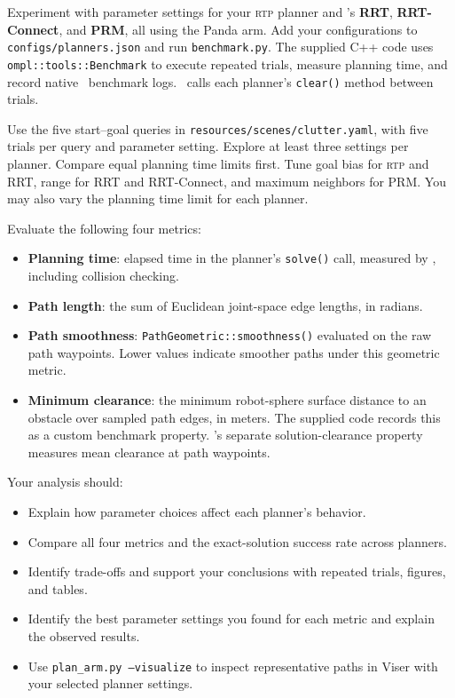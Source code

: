 \documentclass{comp450}
\begin{document}
\begin{enumerate*}
    \newpage
    \item
    Experiment with parameter settings for your \textsc{rtp} planner and \ompl's \textbf{RRT}, \textbf{RRT-Connect}, and \textbf{PRM}, all using the Panda arm.
    Add your configurations to \texttt{configs/planners.json} and run \texttt{benchmark.py}.
    The supplied C++ code uses \texttt{ompl::tools::Benchmark} to execute repeated trials, measure planning time, and record native \ompl\ benchmark logs.
    \ompl\ calls each planner's \texttt{clear()} method between trials.

    Use the five start--goal queries in \texttt{resources/scenes/clutter.yaml}, with five trials per query and parameter setting.
    Explore at least three settings per planner.
    Compare equal planning time limits first.
    Tune goal bias for \textsc{rtp} and RRT, range for RRT and RRT-Connect, and maximum neighbors for PRM.
    You may also vary the planning time limit for each planner.

    Evaluate the following four metrics:
    \begin{itemize}
        \item \textbf{Planning time}: elapsed time in the planner's \texttt{solve()} call, measured by \ompl, including collision checking.
        \item \textbf{Path length}: the sum of Euclidean joint-space edge lengths, in radians.
        \item \textbf{Path smoothness}: \texttt{PathGeometric::smoothness()} evaluated on the raw path waypoints.
        Lower values indicate smoother paths under this geometric metric.
        \item \textbf{Minimum clearance}: the minimum robot-sphere surface distance to an obstacle over sampled path edges, in meters.
        The supplied code records this as a custom benchmark property.
        \ompl's separate solution-clearance property measures mean clearance at path waypoints.
    \end{itemize}

    Your analysis should:
    \begin{itemize}
        \item Explain how parameter choices affect each planner's behavior.
        \item Compare all four metrics and the exact-solution success rate across planners.
        \item Identify trade-offs and support your conclusions with repeated trials, figures, and tables.
        \item Identify the best parameter settings you found for each metric and explain the observed results.
        \item Use \texttt{plan\_arm.py --visualize} to inspect representative paths in Viser with your selected planner settings.
    \end{itemize}


\end{enumerate*}
\end{document}
